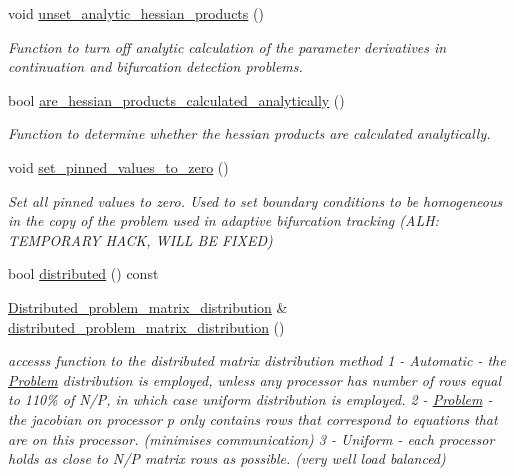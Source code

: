 \begin{DoxyCompactItemize}
void \hyperlink{classoomph_1_1Problem_accd672b3da8c5bf28ad6bd856e28d1cf}{unset\+\_\+analytic\+\_\+hessian\+\_\+products} ()
\begin{DoxyCompactList}\small\item\em Function to turn off analytic calculation of the parameter derivatives in continuation and bifurcation detection problems. \end{DoxyCompactList}\item 
bool \hyperlink{classoomph_1_1Problem_af6235ced9e7e85324f785f2681ab3872}{are\+\_\+hessian\+\_\+products\+\_\+calculated\+\_\+analytically} ()
\begin{DoxyCompactList}\small\item\em Function to determine whether the hessian products are calculated analytically. \end{DoxyCompactList}\item 
void \hyperlink{classoomph_1_1Problem_a820d3c43c7d678b4fe186a8c83a90732}{set\+\_\+pinned\+\_\+values\+\_\+to\+\_\+zero} ()
\begin{DoxyCompactList}\small\item\em Set all pinned values to zero. Used to set boundary conditions to be homogeneous in the copy of the problem used in adaptive bifurcation tracking (A\+LH\+: T\+E\+M\+P\+O\+R\+A\+RY H\+A\+CK, W\+I\+LL BE F\+I\+X\+ED) \end{DoxyCompactList}\item 
bool \hyperlink{classoomph_1_1Problem_af5e9f1623cad361048856a4c0463ea23}{distributed} () const
\item 
\hyperlink{classoomph_1_1Problem_a8fc1f40f2a9309e9ff02772fa2258402}{Distributed\+\_\+problem\+\_\+matrix\+\_\+distribution} \& \hyperlink{classoomph_1_1Problem_a4d329a86be53aee9f96a3428809db5f0}{distributed\+\_\+problem\+\_\+matrix\+\_\+distribution} ()
\begin{DoxyCompactList}\small\item\em accesss function to the distributed matrix distribution method 1 -\/ Automatic -\/ the \hyperlink{classoomph_1_1Problem}{Problem} distribution is employed, unless any processor has number of rows equal to 110\% of N/P, in which case uniform distribution is employed. 2 -\/ \hyperlink{classoomph_1_1Problem}{Problem} -\/ the jacobian on processor p only contains rows that correspond to equations that are on this processor. (minimises communication) 3 -\/ Uniform -\/ each processor holds as close to N/P matrix rows as possible. (very well load balanced) \end{DoxyCompactList}\item 

\end{DoxyCompactItemize}
